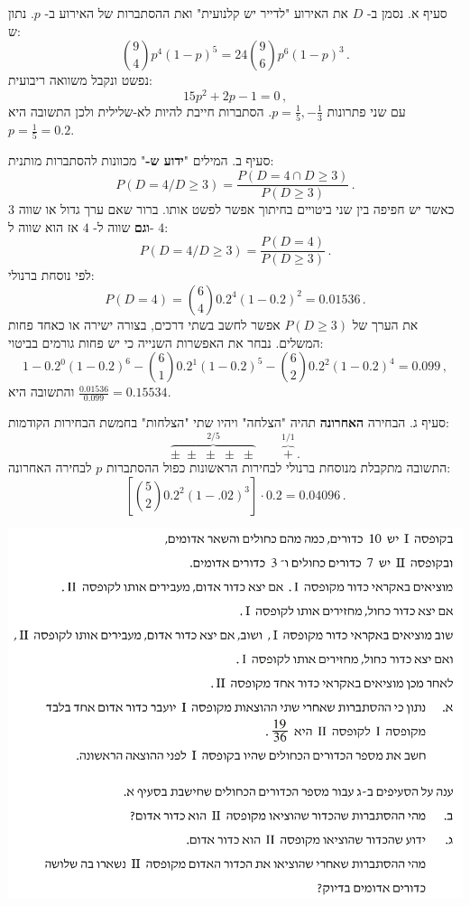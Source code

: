 \documentclass[12pt,a4paper]{article}
\begin{document}
סעיף א. נסמן ב-%
$D$
את האירוע "לדייר יש קלנועית" ואת ההסתברות של האירוע ב-%
$p$.
נתון ש:
\[
{9\choose 4} p^4 (1-p)^5=24 {9\choose 6} p^6 (1-p)^3\,.
\]
נפשט ונקבל משוואה ריבועית:
\[
15p^2+2p-1=0\,,
\]
עם שני פתרונות
$p=\frac{1}{5},-\frac{1}{3}$.
הסתברות חייבת להיות לא-שלילית ולכן התשובה היא 
$p=\frac{1}{5}=0.2$.

סעיף ב. המילים
"\textbf{ידוע ש-}"
מכוונות להסתברות מותנית:
\[
P(D=4/D\ge3) = \frac{P(D=4\cap D\ge 3)}{P(D\ge 3)}\,.
\]
כאשר יש חפיפה בין שני ביטויים בחיתוך אפשר לפשט אותו. ברור שאם ערך גדול או שווה
$3$
\textbf{וגם}
שווה ל-%
$4$
אז הוא שווה ל-%
$4$:
\[
P(D=4/D\ge3) =\frac{P(D=4)}{P(D\ge 3)}\,.
\]
לפי נוסחת ברנולי:
\[
P(D=4)={6\choose 4} 0.2^4 (1-0.2)^2= 0.01536\,.
\]
את הערך של
$P(D\ge 3)$
אפשר לחשב בשתי דרכים, בצורה ישירה או כאחד פחות המשלים. נבחר את האפשרות השנייה כי יש פחות גורמים בביטוי:
\[
1-0.2^0(1-0.2)^6-{6\choose 1}0.2^1(1-0.2)^5 - {6 \choose 2} 0.2^2(1-0.2)^4=0.099\,,
\]
והתשובה היא
$\displaystyle\frac{0.01536}{0.099}=0.15534$.

סעיף ג. הבחירה 
\textbf{האחרונה} 
תהיה "הצלחה" ויהיו שתי "הצלחות" בחמשת הבחירות הקודמות:
\[
\overbrace{\pm\;\pm\;\pm\;\pm\;\pm}^{2/5}\quad\quad \overbrace{+}^{1/1}\,.
\]
התשובה מתקבלת מנוסחת ברנולי לבחירות הראשונות כפול ההסתברות
$p$
לבחירה האחרונה:
\[
\left[{5\choose 2}0.2^2 (1-.02)^3\right]\cdot 0.2=0.04096\,.
\]

\newpage

\textbf{}

\begin{center}
\includegraphics[width=.95\textwidth]{summer-2017b-3}
\end{center}
\end{document}
